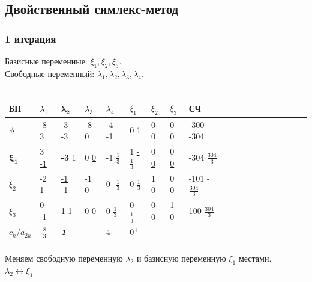 \documentclass[14pt,a4paper,fleqn]{extarticle}
\begin{document}
\subsection*{Двойственный симлекс-метод}
\subsubsection*{1 итерация}
Базисные переменные: $\xi_1, \xi_2, \xi_3$.\\
Свободные переменный: $\lambda_1, \lambda_2, \lambda_3, \lambda_4$.\\\\
\begin{tabularx}{\textwidth}{V{1}p{1.2cm}V{1}p{1.2cm}V{6}p{1.2cm}V{7}p{1.1cm}V{1}p{1.2cm}V{1}p{1.2cm}V{1}p{1.2cm}V{1}p{1.2cm}V{1}p{1.5cm}V{1}}
	\hline
	БП & $\lambda_1$ & $\boldsymbol{\lambda_2}$ & $\lambda_3$ & $\lambda_4$ & $\xi_1$ & $\xi_2$ & $\xi_3$ & СЧ\\
	
	\hline
	
	$\phi$ & \small -8 \scriptsize 3 & \small \underline{-3} \scriptsize -3 & -8 \scriptsize 0 & \small -4  \scriptsize -1 & 0 \scriptsize 1 & 0 \scriptsize 0 & 0 \scriptsize 0 & \small -300 \scriptsize -304\\
	
	\Xhline{6\arrayrulewidth}
	
	$\boldsymbol{\xi_1}$ & \small 3 \scriptsize \underline{-1} & \small \textbf{-3} \scriptsize 1 & 0 \scriptsize \underline{0} & \small -1  \scriptsize \underline{$\frac{1}{3}$} & 1 \scriptsize \underline{-$\frac{1}{3}$} & 0 \scriptsize \underline{0} & 0 \scriptsize \underline{0} & \small -304 \scriptsize \underline{$\frac{304}{3}$}\\
	
	\Xhline{6\arrayrulewidth}
	
	$\xi_2$ & \small -2 \scriptsize 1 & \small \underline{-1} \scriptsize -1 & -1 \scriptsize 0 & \small 0  \scriptsize -$\frac{1}{3}$ & 0 \scriptsize $\frac{1}{3}$ & 1 \scriptsize 0 & 0 \scriptsize 0 & \small -101 \scriptsize -$\frac{304}{3}$\\
	
	\hline
	
	$\xi_3$ & \small 0 \scriptsize -1 & \small \underline{1} \scriptsize 1 & 0 \scriptsize 0 & \small 0  \scriptsize $\frac{1}{3}$ & 0 \scriptsize -$\frac{1}{3}$ & 0 \scriptsize 0 & 1 \scriptsize 0 & \small 100 \scriptsize $\frac{304}{3}$\\
	
	\hdashline
	
	$c_k/a_{2k}$& \small -$\frac{8}{3}$ & \textit{\textbf{1}} & - & 4 & \small $0^+$ & - & - &\\
	
	\hdashline
\end{tabularx}
\newline\newline
Меняем свободную переменную $\lambda_2$ и базисную переменную $\xi_1$ местами.\\
$\lambda_2 \leftrightarrow \xi_1$
\newpage
\end{document}
